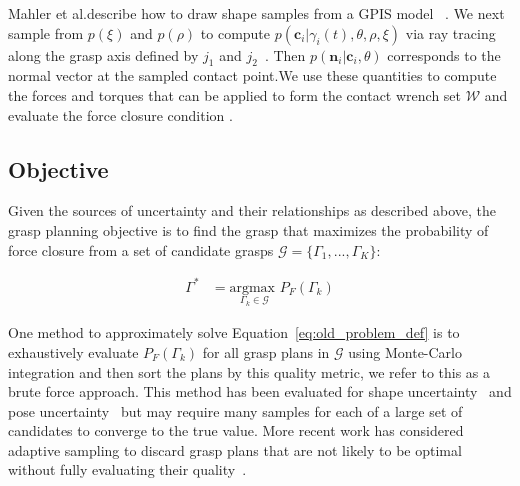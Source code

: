 \documentclass[10pt, conference]{ieeeconf}      %
\newcommand{\mG}{\mathcal{G}}
\newcommand{\mW}{\mathcal{W}}
\begin{document}
 
Mahler et al.describe how to draw shape samples from a GPIS model ~\cite{mahler2015gp}.
We next sample from $p(\xi)$ and $p(\rho)$ to compute $p(\textbf{c}_i|\gamma_i(t),\theta,\rho,\xi)$ via ray tracing along the grasp axis defined by $j_1$ and $j_2$~\cite{newcombe2011kinectfusion}.
Then $p(\textbf{n}_i|\textbf{c}_i,\theta)$ corresponds to the normal vector at the sampled contact point.We use these quantities to compute the forces and torques that can be applied to form the contact wrench set $\mW$ and evaluate the force closure condition \cite{li1988task}.



\subsection{Objective}

Given the sources of uncertainty and their relationships as described above, the grasp planning objective is to find the grasp that maximizes the probability of force closure from a set of candidate grasps $\mG = \{\Gamma_1, ..., \Gamma_K\}$:

\vspace{-2ex}
\begin{align}
\Gamma^* &= \underset{\Gamma_k \in \mG}{\text{argmax }} P_F\left( \Gamma_k\right) \label{eq:old_problem_def}
\end{align}



One method to approximately solve Equation~\ref{eq:old_problem_def} is to exhaustively evaluate $P_F(\Gamma_k)$ for all grasp plans in $\mG$ using Monte-Carlo integration and then sort the plans by this quality metric, we refer to this as a brute force approach. 
This method has been evaluated for shape uncertainty~\cite{christopoulos2007handling, kehoe2012estimating} and pose uncertainty~\cite{weisz2012pose} but may require many samples for each of a large set of candidates to converge to the true value.
More recent work has considered adaptive sampling to discard grasp plans that are not likely to be optimal without fully evaluating their quality~\cite{kehoe2012toward}.
\end{document}

